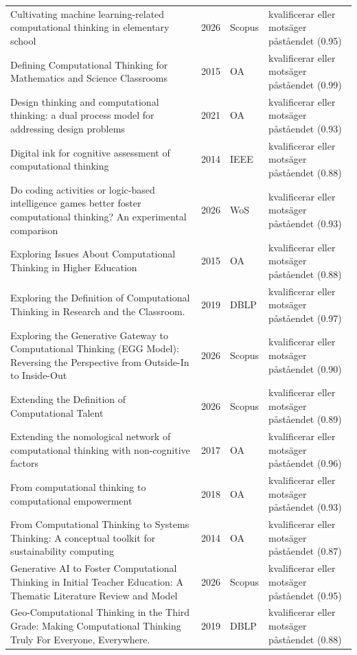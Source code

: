 \begin{longtable}{@{}%
  >{\raggedright\arraybackslash}p{}c%
  >{\raggedright\arraybackslash}p{}%
  >{\raggedright\arraybackslash}p{}@{}}
Cultivating machine learning-related computational thinking in elementary school & 2026 & Scopus & kvalificerar eller motsäger påståendet (0.95) \\
Defining Computational Thinking for Mathematics and Science Classrooms & 2015 & OA & kvalificerar eller motsäger påståendet (0.99) \\
Design thinking and computational thinking: a dual process model for addressing design problems & 2021 & OA & kvalificerar eller motsäger påståendet (0.93) \\
Digital ink for cognitive assessment of computational thinking & 2014 & IEEE & kvalificerar eller motsäger påståendet (0.88) \\
Do coding activities or logic-based intelligence games better foster computational thinking? An experimental comparison & 2026 & WoS & kvalificerar eller motsäger påståendet (0.93) \\
Exploring Issues About Computational Thinking in Higher Education & 2015 & OA & kvalificerar eller motsäger påståendet (0.88) \\
Exploring the Definition of Computational Thinking in Research and the Classroom. & 2019 & DBLP & kvalificerar eller motsäger påståendet (0.97) \\
Exploring the Generative Gateway to Computational Thinking (EGG Model): Reversing the Perspective from Outside-In to Inside-Out & 2026 & Scopus & kvalificerar eller motsäger påståendet (0.90) \\
Extending the Definition of Computational Talent & 2026 & Scopus & kvalificerar eller motsäger påståendet (0.89) \\
Extending the nomological network of computational thinking with non-cognitive factors & 2017 & OA & kvalificerar eller motsäger påståendet (0.96) \\
From computational thinking to computational empowerment & 2018 & OA & kvalificerar eller motsäger påståendet (0.93) \\
From Computational Thinking to Systems Thinking: A conceptual toolkit for sustainability computing & 2014 & OA & kvalificerar eller motsäger påståendet (0.87) \\
Generative AI to Foster Computational Thinking in Initial Teacher Education: A Thematic Literature Review and Model & 2026 & Scopus & kvalificerar eller motsäger påståendet (0.95) \\
Geo-Computational Thinking in the Third Grade: Making Computational Thinking Truly \textquotedbl{}For Everyone, Everywhere\textquotedbl{}. & 2019 & DBLP & kvalificerar eller motsäger påståendet (0.88) \\

\end{longtable}
